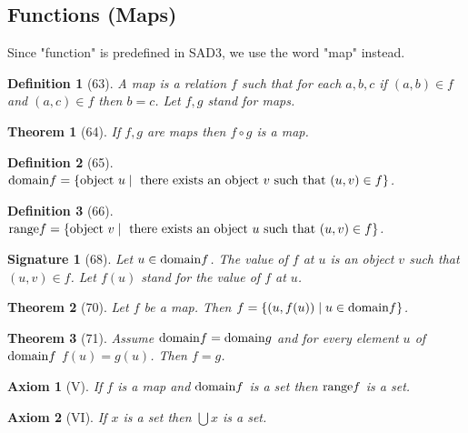 \documentclass{scrartcl}
\newenvironment{forthel}{\begin{leftbar}}{\end{leftbar}}
\newtheorem*{axiom}{Axiom}
\newtheorem*{theorem}{Theorem}
\newtheorem*{definition}{Definition}
\newtheorem*{signature}{Signature}
\newcommand{\op}[2]{({#1},{#2})}
\begin{document}
\subsection{Functions (Maps)}

Since "function" is predefined in SAD3, we use the word "map" instead.

\begin{forthel}
[/prove]
[map/-s]
\begin{definition}[63] A \emph{map} is a relation $f$ such that for each
$a,b,c$ if $\op{a}{b} \in f$ and $\op{a}{c} \in f$ then $b = c$.
Let $f,g$ stand for maps.
\end{definition}

\begin{theorem}[64] If $f, g$ are maps then $f \circ g$ is a map.
\end{theorem}

\begin{definition}[65] ${\rm domain} f = \{\text{object } u \mid 
\text{ there exists an object } v \text{ such that } \op{u}{v} \in f\}$.
\end{definition}

\begin{definition}[66] ${\rm range} f =  \{\text{object } v \mid 
\text{ there exists an object } u \text{ such that } \op{u}{v} \in f\}$.
\end{definition}

\begin{signature}[68] Let $u \in {\rm domain} f$.
The value of $f$ at $u$ is an object $v$ such that $\op{u}{v} \in f$.
Let $f(u)$ stand for the value of $f$ at $u$.
\end{signature}

\begin{theorem}[70] Let $f$ be a map. Then 
$f = \{\op{u}{f(u)} \mid u \in {\rm domain} f\}$.
\end{theorem}

\begin{theorem}[71] 
Assume ${\rm domain} f = {\rm domain} g$ and
for every element $u$ of ${\rm domain} f$  $f(u) = g(u)$.
Then $f = g$.
\end{theorem}

\begin{axiom}[V] If $f$ is a map and ${\rm domain} f$ is a set 
then ${\rm range} f$ is a set.
\end{axiom}

\begin{axiom}[VI] If $x$ is a set then $\bigcup x$ is a set.
\end{axiom}


\end{forthel}
\end{document}
